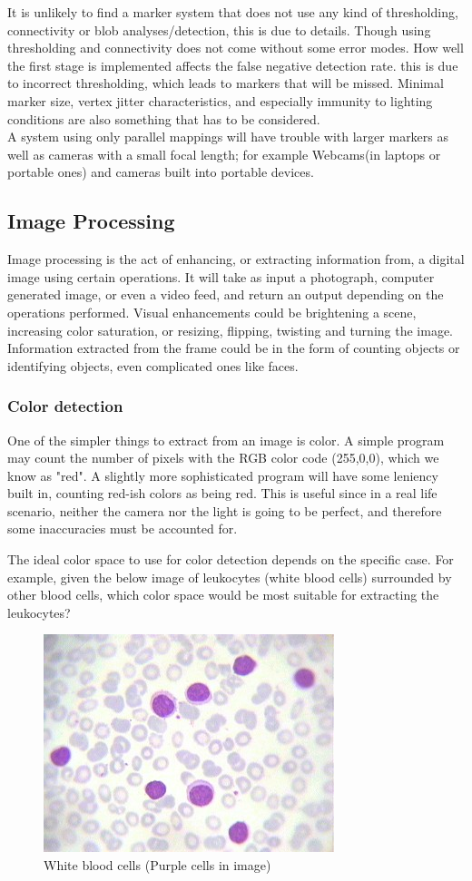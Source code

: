 				It is unlikely to find a marker system that does not use any kind of thresholding, connectivity or blob analyses/detection, this is due to details. Though using thresholding and connectivity does not come without some error modes. How well the first stage is implemented affects the false negative detection rate. this is due to incorrect thresholding, which leads to markers that will be missed. Minimal marker size, vertex jitter characteristics, and especially immunity to
				lighting conditions\cite{fidOcclusion} are also something that has to be considered.\\
				
				A system using only parallel mappings will have trouble with larger markers as well as cameras with a small focal length; for example Webcams(in laptops or portable ones) and cameras built into portable devices.
				 
				
				
				
		\subsection{Image Processing}
		
		Image processing is the act of enhancing, or extracting information from, a digital image using certain operations. It will take as input a photograph, computer generated image, or even a video feed, and return an output depending on the operations performed. Visual enhancements could be brightening a scene, increasing color saturation, or resizing, flipping, twisting and turning the image. Information extracted from the frame could be  in the form of counting objects or identifying objects, even complicated ones like faces. 
		
			\subsubsection{Color detection}
			
			One of the simpler things to extract from an image is color. A simple program may count the number of pixels with the RGB color code (255,0,0), which we know as "red". A slightly more sophisticated program will have some leniency built in, counting red-ish colors as being red. This is useful since in a real life scenario, neither the camera nor the light is going to be perfect, and therefore some inaccuracies must be accounted for. 
			
			The ideal color space to use for color detection depends on the specific case. 
			For example, given the below image of leukocytes (white blood cells) surrounded by other blood cells, which color space would be most suitable for extracting the leukocytes?
			\begin{figure}[H]
				\centering
				\includegraphics[width=0.2\linewidth]{figure/Analysis/leukocytes.jpg}
				\caption{White blood cells (Purple cells in image)}
				\label{fig:leukocytes}
			\end{figure}
			
